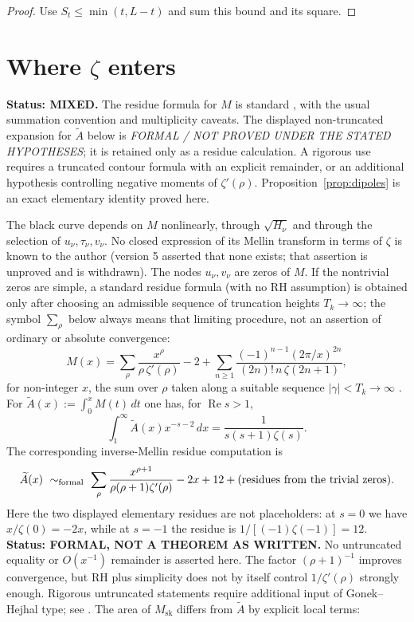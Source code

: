 \documentclass[11pt]{amsart}
\numberwithin{equation}{section}
\theoremstyle{plain}
\theoremstyle{definition}
\theoremstyle{remark}
\newcommand{\Msk}{M_{\mathrm{sk}}}
\begin{document}
\begin{proof}
Use $S_t\le\min(t,L-t)$ and sum this bound and its square.
\end{proof}

\section{Where \texorpdfstring{$\zeta$}{zeta} enters}
\label{sec:zeta}

\noindent\textbf{Status: MIXED.} The residue formula for $M$ is standard
\cite[\S14.27]{Titchmarsh1986}, with the usual summation convention and
multiplicity caveats. The displayed non-truncated expansion for
$\widetilde A$ below is \emph{FORMAL / NOT PROVED UNDER THE STATED
HYPOTHESES}; it is retained only as a residue calculation. A rigorous use
requires a truncated contour formula with an explicit remainder, or an
additional hypothesis controlling negative moments of $\zeta'(\rho)$.
Proposition~\ref{prop:dipoles} is an exact elementary identity proved here.

\medskip

The black curve depends on $M$ nonlinearly, through $\sqrt{H_\nu}$ and
through the selection of $u_\nu,\tau_\nu,v_\nu$. No closed expression of its
Mellin transform in terms of $\zeta$ is known to the author (version 5
asserted that none exists; that assertion is unproved and is withdrawn). The nodes $u_\nu,v_\nu$ are zeros of $M$. If the nontrivial zeros are simple, a standard residue formula (with no RH
assumption) is obtained only after choosing an admissible sequence of
truncation heights $T_k\to\infty$; the symbol $\sum_\rho$ below always means
that limiting procedure, not an assertion of ordinary or absolute
convergence:
\begin{equation}
\label{eq:explicitM}
  M(x)=\sum_{\rho}\frac{x^\rho}{\rho\,\zeta'(\rho)}-2
  +\sum_{n\ge1}\frac{(-1)^{n-1}(2\pi/x)^{2n}}{(2n)!\,n\,\zeta(2n+1)},
\end{equation}
for non-integer $x$, the sum over $\rho$ taken along a suitable sequence
$|\gamma|<T_k\to\infty$ \cite[\S14.27]{Titchmarsh1986}. For
$\widetilde{A}(x):=\int_0^xM(t)\,dt$ one has, for $\operatorname{Re}s>1$,
\begin{equation}
\label{eq:mellin_A}
  \int_1^\infty \widetilde{A}(x)x^{-s-2}\,dx=\frac{1}{s(s+1)\zeta(s)}.
\end{equation}
The corresponding inverse-Mellin residue computation is
\begin{equation}
\label{eq:explicitA}
  \widetilde{A}(x)\ \sim_{\rm formal}\
  \sum_\rho\frac{x^{\rho+1}}{\rho(\rho+1)\zeta'(\rho)}-2x+12
  +\text{(residues from the trivial zeros)}.
\end{equation}
Here the two displayed elementary residues are not placeholders: at $s=0$
we have $x/\zeta(0)=-2x$, while at $s=-1$ the residue is
$1/[(-1)\zeta(-1)]=12$.
\textbf{Status: FORMAL, NOT A THEOREM AS WRITTEN.} No untruncated equality
or $O(x^{-1})$ remainder is asserted here. The factor $(\rho+1)^{-1}$
improves convergence, but RH plus simplicity does not by itself control
$1/\zeta'(\rho)$ strongly enough. Rigorous untruncated statements require
additional input of Gonek--Hejhal type; see \cite{Ng2004}. The area of $\Msk$ differs from
$\widetilde{A}$ by explicit local terms:
\end{document}
